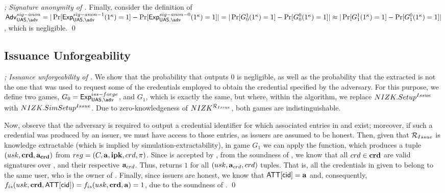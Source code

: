 \begin{proof}[; Signature anonymity of \CUASGen]
  Finally, consider the definition of $\AdvSigAnon=|\Pr\lbrack
  \ExpSigAnono(1^\secpar)=1\rbrack-\Pr\lbrack\ExpSigAnonz(1^\secpar)=1\rbrack|
  = |\Pr\lbrack G_0^1(1^\secpar)=1\rbrack-\Pr\lbrack
  G_0^0(1^\secpar)=1\rbrack| \approx
  |\Pr\lbrack G_1^1(1^\secpar)=1\rbrack-\Pr\lbrack
  G_1^0(1^\secpar)=1\rbrack|$, which is negligible.
  \qed
\end{proof}

\subsection{Issuance Unforgeability}

\begin{proof}[; Issuance unforgeability of \CUASGen]
  We show that the probability that \fissue outputs $0$ is negligible, as well
  as the probability that the extracted \usk is not the one that was used to
  request some of the credentials employed to obtain the credential specified by
  the adversary.
  For this purpose, we define two games, $G_0=\ExpForgeIssue$, and $G_1$, which
  is exactly the same, but where, within the \Setup algorithm, we replace
  $NIZK.Setup^{Issue}$ with $NIZK.SimSetup^{Issue}$. Due to zero-knowledgeness
  of $NIZK^{\mathcal{R}_{Issue}}$, both games are indistinguishable.

  Now, observe that the adversary is required to output a credential
  identifier for which associated entries in \trans and \CRED exist; moreover,
  if such a credential was produced by an issuer, we must have access to those
  entries, as issuers are assumed to be honest.
  Then, given that $\mathcal{R}_{Issue}$ is knowledge extractable (which is implied
  by simulation-extractability), in game $G_1$
  we can apply the \NIZKExtract function, which produces a tuple $(usk,\mathbf{crd},
  \mathbf{a}_{\mathbf{crd}})$ from $reg = (C,\mathbf{a},\mathbf{ipk},crd,\pi)$.
  Since \NIZKproof is accepted by \ExtractIssue, from the soundness of \NIZK, we
  know that all $crd \in \mathbf{crd}$ are valid signatures over \usk, and their
  respective $\mathbf{a}_{crd}$. Thus, \IdentifyCred returns $1$ for all $(usk,
  \mathbf{a}_{crd},crd)$ tuples. That is, all the credentials in \scred given
  to \fissue belong to the same user, who is the owner of \usk.
  Finally, since issuers are honest, we know that $\mathsf{ATT}[\mathsf{cid}] = \mathbf{a}$ and,
  consequently, $f_{is}(usk,\mathbf{crd},\mathsf{ATT}[\mathsf{cid}]) = f_{is}(usk,\mathbf{crd},\mathbf{a})
  = 1$, due to the soundness of \NIZK.
  \qed
\end{proof}

